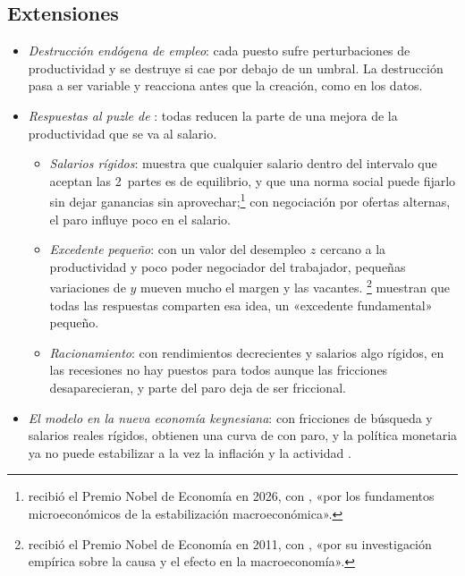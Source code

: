 \documentclass[11pt]{article}
\begin{document}
\subsection{Extensiones}\label{sec:dmp-extensiones}

\begin{itemize}
\item \emph{Destrucción endógena de empleo}\nocite{MortensenPissarides1994Job}: cada puesto sufre perturbaciones de productividad y se destruye si cae por debajo de un umbral. La destrucción pasa a ser variable y reacciona antes que la creación, como en los datos\nocite{DavisHaltiwanger1992Gross}.
\item \emph{Respuestas al puzle de }: todas reducen la parte de una mejora de la productividad que se va al salario.
  \begin{itemize}
  \item \emph{Salarios rígidos}: \textcite{Hall2005Employment} muestra que cualquier salario dentro del intervalo que aceptan las 2~partes es de equilibrio, y que una norma social puede fijarlo sin dejar ganancias sin aprovechar;\footnote{ recibió el Premio Nobel de Economía en 2026, con , «por los fundamentos microeconómicos de la estabilización macroeconómica»\nocite{Nobel2026Prensa}.} con negociación por ofertas alternas, el paro influye poco en el salario\nocite{HallMilgrom2008Limited}.
  \item \emph{Excedente pequeño}: con un valor del desempleo $z$ cercano a la productividad y poco poder negociador del trabajador, pequeñas variaciones de $y$ mueven mucho el margen y las vacantes\nocite{HagedornManovskii2008Cyclical}. \textcite{LjungqvistSargent2017Fundamental}\footnote{ recibió el Premio Nobel de Economía en 2011, con , «por su investigación empírica sobre la causa y el efecto en la macroeconomía»\nocite{Nobel2011SargentSims}.} muestran que todas las respuestas comparten esa idea, un «excedente fundamental» pequeño.
  \item \emph{Racionamiento}: con rendimientos decrecientes y salarios algo rígidos, en las recesiones no hay puestos para todos aunque las fricciones desaparecieran, y parte del paro deja de ser friccional\nocite{Michaillat2012Matching}.
  \end{itemize}
\item \emph{El modelo en la nueva economía keynesiana}: con fricciones de búsqueda y salarios reales rígidos, \textcite{BlanchardGali2010Labor} obtienen una curva de  con paro, y la política monetaria ya no puede estabilizar a la vez la inflación y la actividad  .

\end{itemize}
\end{document}
